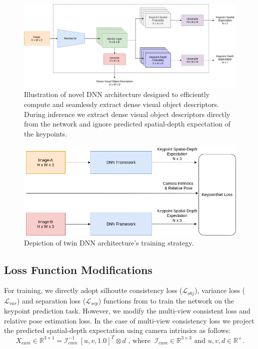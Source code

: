 \begin{figure}[htb]
    \centering
    \includegraphics[scale=0.3]{images/arch.png}
    \caption{Illustration of novel DNN architecture designed to efficiently compute and seamlessly extract dense visual object descriptors.
        During inference we extract dense visual object descriptors directly from the network and ignore predicted spatial-depth expectation of the keypoints.}
    \label{fig:modified_dnn}
\end{figure}

\begin{figure}[htb]
    \centering
    \includegraphics[scale=0.3]{images/twin.png}
    \caption{Depiction of twin DNN architecture's training strategy.}
    \label{fig:twin_architecture}
\end{figure}






\subsection{Loss Function Modifications}

For training, we directly adopt silhoutte consistency loss ($\mathcal{L}_{obj}$), variance loss ($\mathcal{L}_{var}$) and separation loss ($\mathcal{L}_{sep}$) functions from \cite{suwajanakorn2018discovery} to train the network on the keypoint prediction task.
However, we modify the multi-view consistent loss and relative pose estimation loss. In the case of multi-view consistency loss we
project the predicted spatial-depth expectation using camera intrinsics as follows:
\begin{equation}
    X_{cam} \in \mathbb{R}^{3 \times 1} = \mathcal{I}_{cam}^{-1}  \ [u, v, 1.0]^T \otimes d \text{ , where  } \ \mathcal{I}_{cam} \in \mathbb{R}^{3 \times 3} \text{ and }  u, v, d \in \mathbb{R}^+.
\end{equation}

